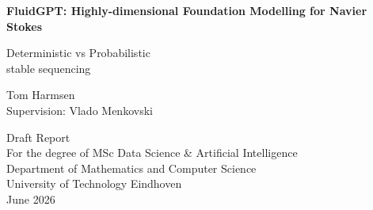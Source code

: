\begin{titlepage}

    \begin{center}
        \vspace*{2cm}

        \LARGE
        \bf FluidGPT: Highly-dimensional Foundation Modelling for Navier Stokes
        
        \large Deterministic vs Probabilistic \\ stable sequencing
        \vspace{4cm}

        \large
        Tom Harmsen \\
        Supervision: Vlado Menkovski

        \vfill

        \normalsize
        Draft Report\\[0.3cm]
        For the degree of MSc Data Science \& Artificial Intelligence\\
        Department of Mathematics and Computer Science\\
        University of Technology Eindhoven\\[2cm]

        June 2026

    \end{center}
\end{titlepage}